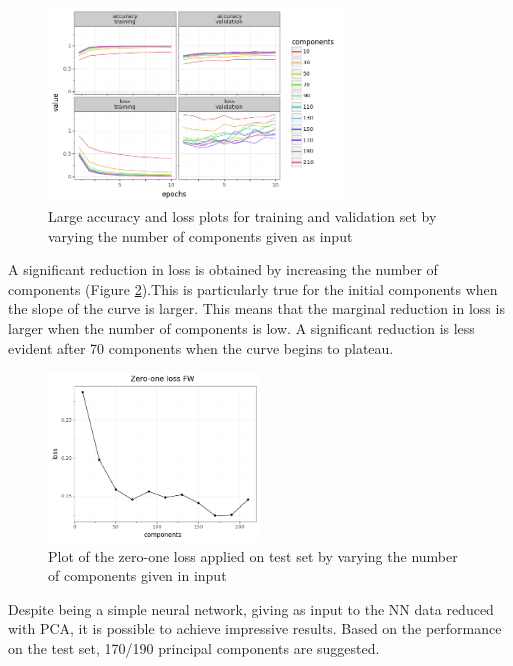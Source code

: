 \documentclass[10pt,english, openany]{book}
\begin{document}
\begin{figure}[H]
    \centering
    \includegraphics[width=0.7\textwidth]{Images/1.6. Accuracy and loss with different components large.png}
    \caption{\label{fig: 4.8}Large accuracy and loss plots for training and validation set by varying the number of components given as input}
\end{figure}

\clearpage
A significant reduction in loss is obtained by increasing the number of components (Figure \ref{fig: 4.9}).This is particularly true for the initial components when the slope of the curve is larger. This means that the marginal reduction in loss is larger when the number of components is low. A significant reduction is less evident after 70 components when the curve begins to plateau.

\begin{figure}[H]
    \centering
    \includegraphics[width=0.5\textwidth]{Images/1.7. Test zero one loss.png}
    \caption{\label{fig: 4.9}Plot of the zero-one loss applied on test set by varying the number of components given in input}
\end{figure}

Despite being a simple neural network, giving as input to the NN data reduced with PCA, it is possible to achieve impressive results. Based on the performance on the test set, 170/190 principal components are suggested.
\end{document}
